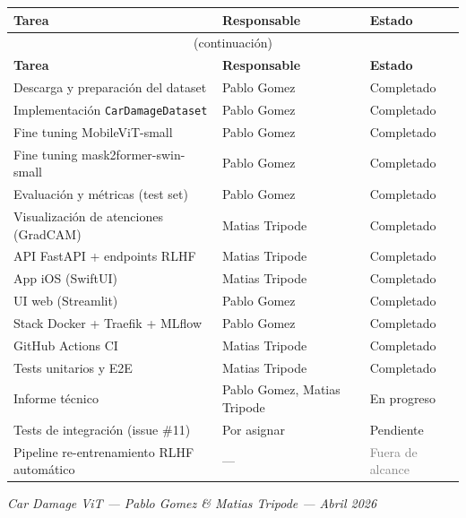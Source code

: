 \documentclass[12pt,a4paper]{article}
\begin{document}
\begin{longtable}{p{6cm} p{3.5cm} p{2.5cm}}
  \toprule
  \textbf{Tarea} & \textbf{Responsable} & \textbf{Estado} \\
  \midrule
  \endfirsthead
  \multicolumn{3}{c}{\small (continuación)} \\
  \toprule
  \textbf{Tarea} & \textbf{Responsable} & \textbf{Estado} \\
  \midrule
  \endhead
  \bottomrule
  \endfoot

  \rowcolor{rowgray}
  Descarga y preparación del dataset & Pablo Gomez & \textcolor{green!60!black}{Completado} \\
  Implementación \texttt{CarDamageDataset} & Pablo Gomez  & \textcolor{green!60!black}{Completado} \\
  \rowcolor{rowgray}
  Fine tuning MobileViT-small & Pablo Gomez & \textcolor{green!60!black}{Completado} \\
  Fine tuning mask2former-swin-small & Pablo Gomez & \textcolor{green!60!black}{Completado} \\
  \rowcolor{rowgray}
  Evaluación y métricas (test set) & Pablo Gomez & \textcolor{green!60!black}{Completado} \\
  Visualización de atenciones (GradCAM) & Matias Tripode & \textcolor{green!60!black}{Completado} \\
  \rowcolor{rowgray}
  API FastAPI + endpoints RLHF & Matias Tripode & \textcolor{green!60!black}{Completado} \\
  App iOS (SwiftUI) & Matias Tripode & \textcolor{green!60!black}{Completado} \\
  \rowcolor{rowgray}
  UI web (Streamlit) & Pablo Gomez & \textcolor{green!60!black}{Completado} \\
  Stack Docker + Traefik + MLflow & Pablo Gomez & \textcolor{green!60!black}{Completado} \\
  \rowcolor{rowgray}
  GitHub Actions CI & Matias Tripode & \textcolor{green!60!black}{Completado} \\
  Tests unitarios y E2E & Matias Tripode & \textcolor{green!60!black}{Completado} \\
  \rowcolor{rowgray}
  Informe técnico & Pablo Gomez, Matias Tripode & \textcolor{orange!80!black}{En progreso} \\
  Tests de integración (issue \#11) & Por asignar & \textcolor{red!70!black}{Pendiente} \\
  \rowcolor{rowgray}
  Pipeline re-entrenamiento RLHF automático & --- & \textcolor{gray}{Fuera de alcance} \\
\end{longtable}

\vspace{0.5cm}

\begin{center}
  \small\textit{Car Damage ViT — Pablo Gomez \& Matias Tripode — Abril 2026}
\end{center}
\end{document}

